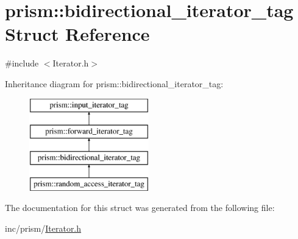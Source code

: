 \hypertarget{structprism_1_1bidirectional__iterator__tag}{}\section{prism\+:\+:bidirectional\+\_\+iterator\+\_\+tag Struct Reference}
\label{structprism_1_1bidirectional__iterator__tag}


{\ttfamily \#include $<$Iterator.\+h$>$}

Inheritance diagram for prism\+:\+:bidirectional\+\_\+iterator\+\_\+tag\+:\begin{figure}[H]
\begin{center}
\leavevmode
\includegraphics[height=4.000000cm]{structprism_1_1bidirectional__iterator__tag}
\end{center}
\end{figure}


The documentation for this struct was generated from the following file\+:\begin{DoxyCompactItemize}
\item 
inc/prism/\hyperlink{_iterator_8h}{Iterator.\+h}\end{DoxyCompactItemize}
